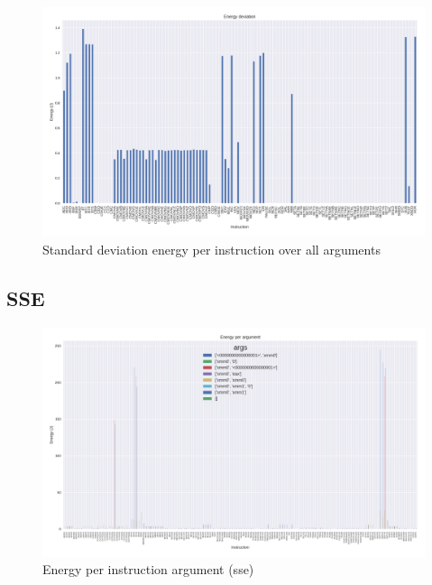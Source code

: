 \begin{figure}
	\centering
	\includegraphics[width=\textwidth]{experiments/figures/inst_std_en_generic.png}
	\caption{Standard deviation energy per instruction over all arguments}
	\label{fig:experiment_en3}
\end{figure}

\subsection{SSE}

\begin{figure}
	\centering
	\includegraphics[width=\textwidth]{experiments/figures/inst_en_args_sse.png}
	\caption{Energy per instruction argument (sse)}
	\label{fig:experiment_en4}
\end{figure}

